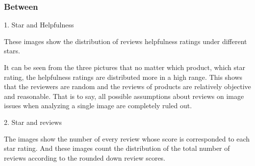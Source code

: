 \documentclass[12pt]{article}
\begin{document}
\subsubsection{Between}
\par
1. Star and Helpfulness
\par\quad\par\quad\par\quad\par\quad\par\quad\par\quad\par\quad\par\quad\par\quad\par\quad\par
These images show the distribution of reviews helpfulness ratings under different stars.
\par
It can be seen from the three pictures that no matter which product, which star rating, the helpfulness ratings are distributed more in a high range. This shows that the reviewers are random and the reviews of products are relatively objective and reasonable. That is to say, all possible assumptions about reviews on image issues when analyzing a single image are completely ruled out.
\par
2. Star and reviews
\par\quad\par\quad\par\quad\par\quad\par\quad\par\quad\par\quad\par\quad\par\quad\par\quad\par
The images show the number of every review whose score is corresponded to each star rating. And these images count the distribution of the total number of reviews according to the rounded down review scores.
\par
\end{document}
